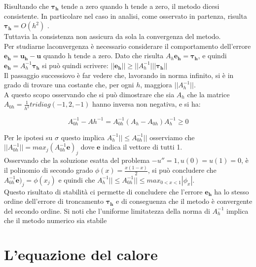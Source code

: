 \vspace{1em}

Risultando che $\boldsymbol{\tau_h}$ tende a zero quando h tende a zero, il metodo dicesi consistente. In particolare nel caso in analisi, come osservato in partenza, risulta $\boldsymbol{\tau_h} = O(h^2)$ .\\
Tuttavia la consistenza non assicura da sola la convergenza del metodo.\\
Per studiarne laconvergenza è necessario considerare il comportamento dell’errore $\boldsymbol{e_h} = \boldsymbol{u_h} -\boldsymbol{u}$ quando h tende a zero. Dato che risulta $A_h\boldsymbol{e_h} = \boldsymbol{\tau_h}$, e quindi $\boldsymbol{e_h} = A_h^{-1} \boldsymbol{\tau_h}$ si può quindi scrivere: $||\boldsymbol{e_h}||\geq ||A_h^{-1}|| |\boldsymbol{\tau_h}||$\\
Il passaggio successiovo è far vedere che, lavorando in norma infinito, si è in grado di trovare una costante che, per ogni $h$, maggiora $||A_h^{-1}||$. \\
A questo scopo osservando che si può dimostrare che sia $A_h$ che la matrice $A_{0h} = \frac{1}{h^2} tridiag(-1,2,-1)$ hanno inversa non negativa, e si ha: 

$$A_{0h}^{-1}-A{h}^{-1}=A_{0h}^{-1}(A_h-A_{0h})A_h^{-1}\geq0$$

Per le ipotesi su $\sigma$ questo implica $A_h^{-1}||\leq A_{0h}^{-1}||$
osserviamo che
$||A_{0h}^{-1}||=max_j(A_{0h}^{-1}\boldsymbol{e})_j$ dove $\boldsymbol{e}$ indica il vettore di tutti 1.\\
Osservando che la soluzione esatta del problema $-u'' = 1, u(0) = u(1) = 0$, è il polinomio di secondo grado $\phi(x) = \frac{x(1-x)}{2}$, si può concludere che $A_{0h}^{-1}\boldsymbol{e})_j=\phi(x_j)$ e quindi che $A_h^{-1}||\leq A_{0h}^{-1}||\leq max_{0<x<1}|\phi_x|$.\\
Questo risultato di stabilità ci permette di concludere che l’errore $\boldsymbol{e_h}$ ha lo stesso ordine dell’errore di troncamento $\boldsymbol{\tau_h}$ e di conseguenza che il metodo è convergente del secondo ordine.
Si noti che l’uniforme limitatezza della norma di $A_h^{-1}$ implica che il metodo numerico sia stabile 






\section{L'equazione del calore}

